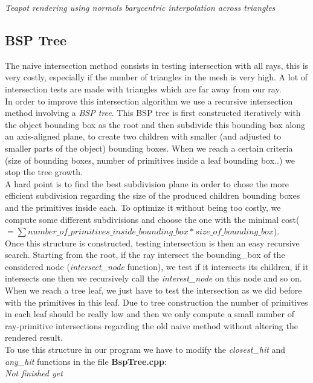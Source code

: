 \documentclass[a4,12pt]{article}
\begin{document}
\begin{center}
\begin{minipage}[b]{0.40\linewidth}
\begin{center}
				\textit{Teapot rendering using normals barycentric interpolation across triangles}
			\end{center}
		\end{minipage}
	\end{center}
	
	\subsection{BSP Tree}
	The naive intersection method consists in testing intersection with all rays, this is very costly, especially if the number of triangles in the mesh is very high. A lot of intersection tests are made with triangles which are far away from our ray.\\
	
	In order to improve this intersection algorithm we use a recursive intersection method involving a \textit{BSP tree}. This BSP tree is first constructed iteratively with the object bounding box as the root and then subdivide this bounding box along an axis-aligned plane, to create two children with smaller (and adjusted to smaller parts of the object) bounding boxes. When we reach a certain criteria (size of bounding boxes, number of primitives inside a leaf bounding box..) we stop the tree growth.\\
	
	A hard point is to find the best subdivision plane in order to chose the more efficient subdivision regarding the size of the produced children bounding boxes and the primitives inside each. To optimize it without being too costly, we compute some different subdivisions and choose the one with the minimal cost($= \sum number\_of\_primitives\_inside\_bounding\_box*size\_of\_bounding\_box$).\\
	
	Once this structure is constructed, testing intersection is then an easy recursive search. Starting from the root, if the ray intersect the bounding\_box of the considered node (\textit{intersect\_node} function), we test if it intersects its children, if it intersects one then we recursively call the \textit{interest\_node} on this node and so on. When we reach a tree leaf, we just have to test the intersection as we did before with the primitives in this leaf. Due to tree construction the number of primitives in each leaf should be really low and then we only compute a small number of ray-primitive intersections regarding the old naive method without altering the rendered result.\\
	
	To use this structure in our program we have to modify the \textit{closest\_hit} and \textit{any\_hit} functions in the file \textbf{BspTree.cpp}:\\
	
	
	\textit{Not finished yet}
	
	
\end{document}
